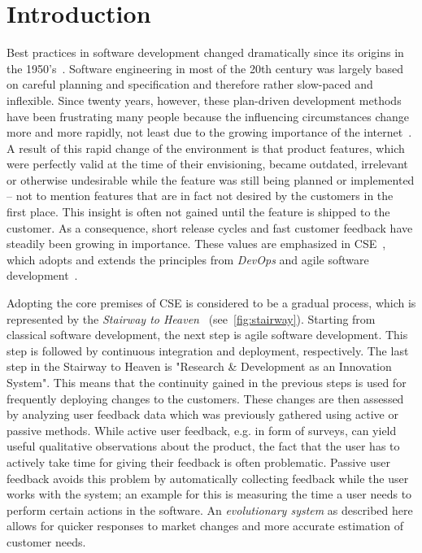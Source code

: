 %
\chapter{Introduction}
\label{sec:intro}

Best practices in software development changed dramatically since its origins in the 1950's~\cite{boehm2006view}.
Software engineering in most of the 20th century was largely based on careful planning and specification and therefore rather slow-paced and inflexible.
Since twenty years, however, these plan-driven development methods have been frustrating many people because the influencing circumstances change more and more rapidly, not least due to the growing importance of the internet~\cite{Williams2003}.
A result of this rapid change of the environment is that product features, which were perfectly valid at the time of their envisioning, became outdated, irrelevant or otherwise undesirable while the feature was still being planned or implemented -- not to mention features that are in fact not desired by the customers in the first place.
This insight is often not gained until the feature is shipped to the customer.
As a consequence, short release cycles and fast customer feedback have steadily been growing in importance.
These values are emphasized in \acf{CSE}~\cite{Bosch2014}, which adopts and extends the principles from \emph{DevOps} and agile software development~\cite{Fitzgerald2017,fowler2001agile}.

Adopting the core premises of \ac{CSE} is considered to be a gradual process, which is represented by the \emph{Stairway to Heaven}~\cite{Olsson2012} (see~\cref{fig:stairway}).
Starting from classical software development, the next step is agile software development.
This step is followed by continuous integration and deployment, respectively. 
The last step in the Stairway to Heaven is "Research \& Development as an Innovation System".
This means that the continuity gained in the previous steps is used for frequently deploying changes to the customers.
These changes are then assessed by analyzing user feedback data which was previously gathered using active or passive methods.
While active user feedback, e.g. in form of surveys, can yield useful qualitative observations about the product, the fact that the user has to actively take time for giving their feedback is often problematic.
Passive user feedback avoids this problem by automatically collecting feedback while the user works with the system; an example for this is measuring the time a user needs to perform certain actions in the software.
An \emph{evolutionary system} as described here allows for quicker responses to market changes and more accurate estimation of customer needs.

